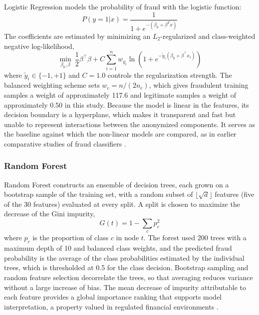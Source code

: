 \documentclass[conference]{IEEEtran}
\begin{document}
Logistic Regression \cite{hosmer2013applied} models the probability of fraud with the logistic function:
\begin{equation}
    P(y=1|x) = \frac{1}{1 + e^{-(\beta_0 + \beta^T x)}}
\end{equation}
The coefficients are estimated by minimizing an $L_2$-regularized and class-weighted negative log-likelihood,
\begin{equation}
    \min_{\beta_0,\beta}\ \frac{1}{2}\beta^{\top}\beta + C\sum_{i=1}^{n} w_{y_i}\ln\!\left(1+e^{-\tilde{y}_i(\beta_0+\beta^{\top}x_i)}\right)
\end{equation}
where $\tilde{y}_i\in\{-1,+1\}$ and $C=1.0$ controls the regularization strength. The balanced weighting scheme sets $w_c = n/(2 n_c)$, which gives fraudulent training samples a weight of approximately 117.6 and legitimate samples a weight of approximately 0.50 in this study. Because the model is linear in the features, its decision boundary is a hyperplane, which makes it transparent and fast but unable to represent interactions between the anonymized components. It serves as the baseline against which the non-linear models are compared, as in earlier comparative studies of fraud classifiers \cite{bhattacharyya2011data}.

\subsubsection{Random Forest}

Random Forest \cite{breiman2001random} constructs an ensemble of decision trees, each grown on a bootstrap sample of the training set, with a random subset of $\lfloor\sqrt{d}\rfloor$ features (five of the 30 features) evaluated at every split. A split is chosen to maximize the decrease of the Gini impurity,
\begin{equation}
    G(t) = 1 - \sum_{c} p_c^2
\end{equation}
where $p_c$ is the proportion of class $c$ in node $t$. The forest used 200 trees with a maximum depth of 10 and balanced class weights, and the predicted fraud probability is the average of the class probabilities estimated by the individual trees, which is thresholded at 0.5 for the class decision. Bootstrap sampling and random feature selection decorrelate the trees, so that averaging reduces variance without a large increase of bias. The mean decrease of impurity attributable to each feature provides a global importance ranking that supports model interpretation, a property valued in regulated financial environments \cite{bhattacharyya2011data}.
\end{document}
